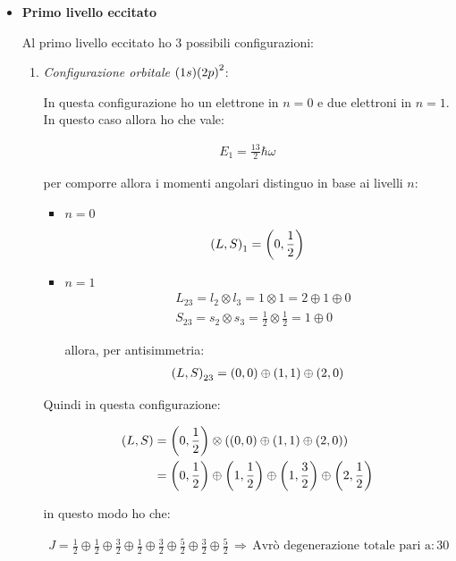 \begin{itemize}
	\item \textbf{Primo livello eccitato} 
	
		Al primo livello eccitato ho $3$ possibili configurazioni:
		
	\begin{enumerate}
		\item \textit{Configurazione orbitale} $\qty(1s)\qty(2p)^2$: 
		
			In questa configurazione ho un elettrone in $n = 0$ e due elettroni in $n = 1$. In questo caso allora ho che vale:
			
		\begin{align*}
			E_1 = \frac{13}{2} \hbar \omega
		\end{align*}
		
			per comporre allora i momenti angolari distinguo in base ai livelli $n$:
		
		\begin{itemize}
			\item $n= 0$
			\begin{align*}
				\qty(L, S)_1 = \qty(0, \frac{1}{2})
			\end{align*}
			
			\item $n = 1$
			\begin{align*}
				& L_{23} = l_2 \otimes l_3 = 1 \otimes 1 = 2 \oplus 1 \oplus 0 \\
				& S_{23} = s_2 \otimes s_3 = \frac{1}{2} \otimes \frac{1}{2} = 1 \oplus 0
			\end{align*}
			
				allora, per antisimmetria:
			\begin{align*}
				\qty(L, S)_{23} = \qty(0, 0) \oplus \qty(1, 1) \oplus \qty(2, 0)
			\end{align*}

		\end{itemize}

			Quindi in questa configurazione:
			
		\begin{align*}
			\qty(L, S) & = \qty(0, \frac{1}{2}) \otimes \qty(\qty(0, 0) \oplus \qty(1, 1) \oplus \qty(2, 0)) \\
			& = \qty(0, \frac{1}{2}) \oplus \qty(1, \frac{1}{2}) \oplus \qty(1, \frac{3}{2}) \oplus \qty(2, \frac{1}{2})
		\end{align*}
		
			in questo modo ho che:
			
		\begin{align*}
			J = \frac{1}{2} \oplus \frac{1}{2} \oplus \frac{3}{2} \oplus \frac{1}{2} \oplus \frac{3}{2} \oplus \frac{5}{2} \oplus \frac{3}{2} \oplus \frac{5}{2} \, \Rightarrow \, \text{Avrò degenerazione totale pari a:} \, 30
		\end{align*}


\end{enumerate}
\end{itemize}
